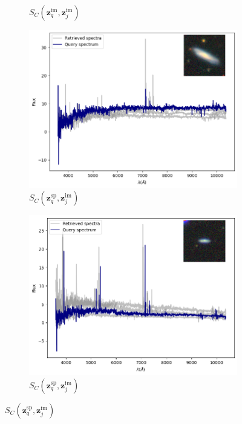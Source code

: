 \documentclass[a4paper,12pt]{article}
\begin{document}
\begin{figure}[H]
\begin{subfigure}[b]{0.45\textwidth}
        \caption{$S_C(\mathbf{z}_q^{\text{im}}, \mathbf{z}_j^{\text{im}})$}
        \label{fig:im_im_2}
    \end{subfigure}

    \begin{subfigure}[b]{0.45\textwidth}
        \centering
        \includegraphics[width=\textwidth]{../figures/spectral_retrieval_im_sp_1}
        \caption{$S_C(\mathbf{z}_q^{\text{sp}}, \mathbf{z}_j^{\text{im}})$}
        \label{fig:im_sp_1}
    \end{subfigure}%
    \hfill
    \begin{subfigure}[b]{0.45\textwidth}
        \centering
        \includegraphics[width=\textwidth]{../figures/spectral_retrieval_im_sp_2}
        \caption{$S_C(\mathbf{z}_q^{\text{sp}}, \mathbf{z}_j^{\text{im}})$}
        \label{fig:im_sp_2}
    \end{subfigure}


\end{figure}
\end{document}
